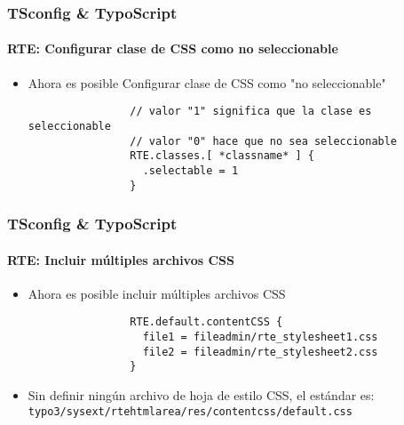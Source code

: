 
\begin{frame}[fragile]
	\frametitle{TSconfig \& TypoScript}
	\framesubtitle{RTE: Configurar clase de CSS como no seleccionable}

	\begin{itemize}
		\item Ahora es posible Configurar clase de CSS como "no seleccionable"

			\begin{lstlisting}
				// valor "1" significa que la clase es seleccionable
				// valor "0" hace que no sea seleccionable
				RTE.classes.[ *classname* ] {
				  .selectable = 1
				}
			\end{lstlisting}

	\end{itemize}

\end{frame}


\begin{frame}[fragile]
	\frametitle{TSconfig \& TypoScript}
	\framesubtitle{RTE: Incluir múltiples archivos CSS}

	\begin{itemize}
		\item Ahora es posible incluir múltiples archivos CSS

			\begin{lstlisting}
				RTE.default.contentCSS {
				  file1 = fileadmin/rte_stylesheet1.css
				  file2 = fileadmin/rte_stylesheet2.css
				}
			\end{lstlisting}

		\item Sin definir ningún archivo de hoja de estilo CSS, el estándar es:\newline
			\texttt{typo3/sysext/rtehtmlarea/res/contentcss/default.css}

	\end{itemize}

\end{frame}

